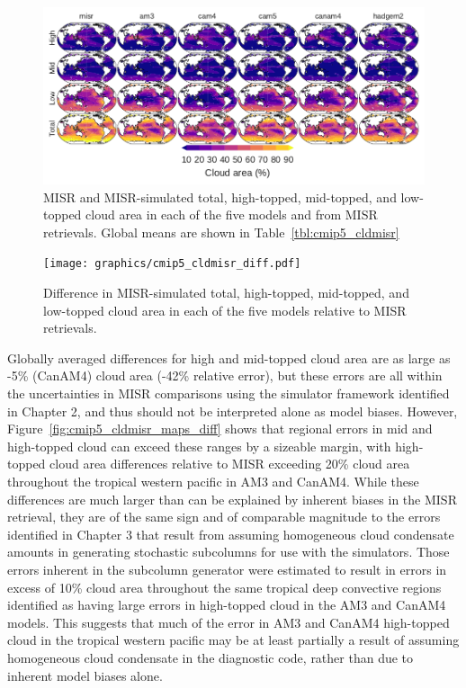 \begin{figure}[htbp]
\centering
\includegraphics{graphics/cmip5_cldmisr.pdf}
\caption{\label{fig:cmip5_cldmisr_maps}MISR and MISR-simulated total,
high-topped, mid-topped, and low-topped cloud area in each of the five
models and from MISR retrievals. Global means are shown in
Table~\ref{tbl:cmip5_cldmisr}}\label{fig:cmip5ux5fcldmisrux5fmaps}
\end{figure}

\begin{figure}[htbp]
\centering
\texttt{[image: graphics/cmip5\_cldmisr\_diff.pdf]}
\caption{\label{fig:cmip5_cldmisr_maps_diff}Difference in MISR-simulated
total, high-topped, mid-topped, and low-topped cloud area in each of the
five models relative to MISR
retrievals.}\label{fig:cmip5ux5fcldmisrux5fmapsux5fdiff}
\end{figure}

Globally averaged differences for high and mid-topped cloud area are as
large as -5\% (CanAM4) cloud area (-42\% relative error), but these
errors are all within the uncertainties in MISR comparisons using the
simulator framework identified in Chapter 2, and thus should not be
interpreted alone as model biases. However,
Figure~\ref{fig:cmip5_cldmisr_maps_diff} shows that regional errors in
mid and high-topped cloud can exceed these ranges by a sizeable margin,
with high-topped cloud area differences relative to MISR exceeding 20\%
cloud area throughout the tropical western pacific in AM3 and CanAM4.
While these differences are much larger than can be explained by
inherent biases in the MISR retrieval, they are of the same sign and of
comparable magnitude to the errors identified in Chapter 3 that result
from assuming homogeneous cloud condensate amounts in generating
stochastic subcolumns for use with the simulators. Those errors inherent
in the subcolumn generator were estimated to result in errors in excess
of 10\% cloud area throughout the same tropical deep convective regions
identified as having large errors in high-topped cloud in the AM3 and
CanAM4 models. This suggests that much of the error in AM3 and CanAM4
high-topped cloud in the tropical western pacific may be at least
partially a result of assuming homogeneous cloud condensate in the
diagnostic code, rather than due to inherent model biases alone.

